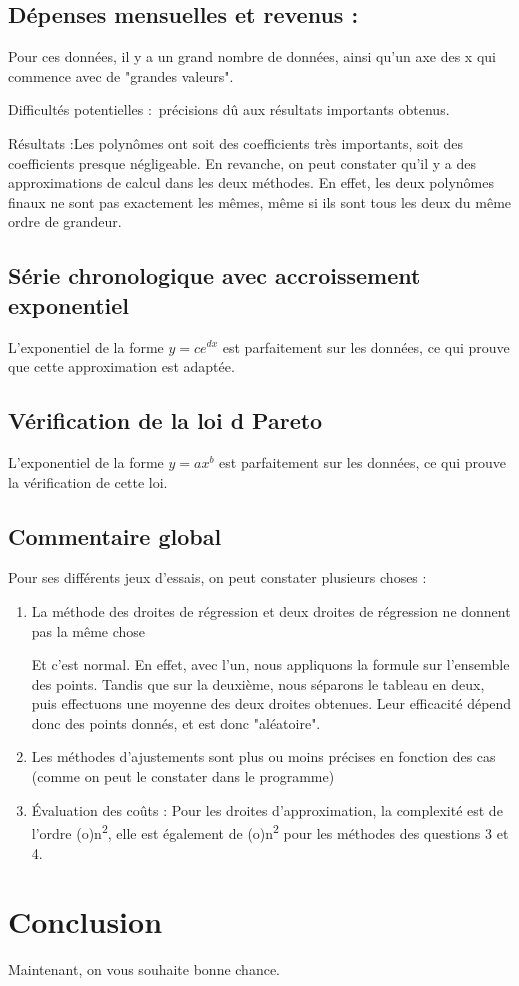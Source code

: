 \documentclass[letter]{article}
\begin{document}
\subsection{Dépenses mensuelles et revenus :}
\label{sec:org578d6a9}

Pour ces données, il y a un grand nombre de données, ainsi qu'un axe des x qui commence avec de "grandes valeurs".

Difficultés potentielles : précisions dû aux résultats importants obtenus.


Résultats :Les polynômes ont soit des coefficients très importants, soit des coefficients presque négligeable. En revanche, on peut constater qu'il y a des approximations de calcul dans les deux méthodes. En effet, les deux polynômes finaux ne sont pas exactement les mêmes, même si ils sont tous les deux du même ordre de grandeur.


\subsection{Série chronologique avec accroissement exponentiel}
\label{sec:org14c4a82}

L'exponentiel de la forme \(y = ce^{dx}\) est parfaitement sur les données, ce qui prouve que cette approximation est adaptée.

\subsection{Vérification de la loi d Pareto}
\label{sec:orgf142cf4}

L'exponentiel de la forme \(y = ax^b\) est parfaitement sur les données, ce qui prouve la vérification de cette loi.

\subsection{Commentaire global}
\label{sec:org1500eb3}

Pour ses différents jeux d'essais, on peut constater plusieurs choses :

\begin{enumerate}
\item La méthode des droites de régression et deux droites de régression ne donnent pas la même chose

Et c'est normal. En effet, avec l'un, nous appliquons la formule sur l'ensemble des points. Tandis que sur la deuxième, nous séparons le tableau en deux, puis effectuons une moyenne des deux droites obtenues. Leur efficacité dépend donc des points donnés, et est donc "aléatoire".

\item Les méthodes d'ajustements sont plus ou moins précises en fonction des cas (comme on peut le constater dans le programme)

\item Évaluation des coûts :
Pour les droites d'approximation, la complexité est de l'ordre (o)n\textsuperscript{2}, elle est également de (o)n\textsuperscript{2} pour les méthodes des questions 3 et 4.
\end{enumerate}


\section{Conclusion}
\label{sec:org9cc52f3}

Maintenant, on vous souhaite bonne chance.
\end{document}
